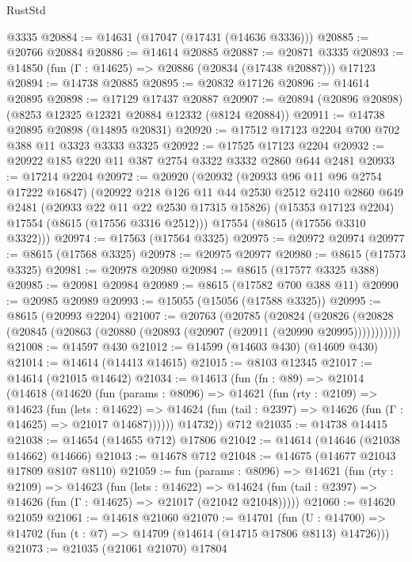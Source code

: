 \begin{lexlean}{RustStd}
\begin{coremodule}
    @3335
@20884 := @14631 (@17047 (@17431 (@14636 @3336)))
@20885 := @20766 @20884
@20886 := @14614 @20885
@20887 := @20871 @3335
@20893 := @14850 (fun (Γ : @14625) => @20886 (@20834 (@17438 @20887))) @17123
@20894 := @14738 @20885
@20895 := @20832 @17126
@20896 := @14614 @20895
@20898 := @17129 @17437 @20887
@20907 := @20894 (@20896 @20898) (@8253 @12325 @12321 @20884 @12332 (@8124 @20884))
@20911 := @14738 @20895 @20898 (@14895 @20831)
@20920 := @17512 @17123 @2204 @700 @702 @388 @11 @3323 @3333 @3325
@20922 := @17525 @17123 @2204
@20932 := @20922 @185 @220 @11 @387 @2754 @3322 @3332 @2860 @644 @2481
@20933 := @17214 @2204
@20972 := @20920
    (@20932
      (@20933 @96 @11 @96 @2754 @17222 @16847)
      (@20922
        @218
        @126
        @11
        @44
        @2530
        @2512
        @2410
        @2860
        @649
        @2481
        (@20933 @22 @11 @22 @2530 @17315 @15826)
        (@15353 @17123 @2204)
        @17554
        (@8615 (@17556 @3316 @2512)))
      @17554
      (@8615 (@17556 @3310 @3322)))
@20974 := @17563 (@17564 @3325)
@20975 := @20972 @20974
@20977 := @8615 (@17568 @3325)
@20978 := @20975 @20977
@20980 := @8615 (@17573 @3325)
@20981 := @20978 @20980
@20984 := @8615 (@17577 @3325 @388)
@20985 := @20981 @20984
@20989 := @8615 (@17582 @700 @388 @11)
@20990 := @20985 @20989
@20993 := @15055 (@15056 (@17588 @3325))
@20995 := @8615 (@20993 @2204)
@21007 := @20763
    (@20785
      (@20824
        (@20826 (@20828 (@20845 (@20863 (@20880 (@20893 (@20907 (@20911 (@20990 @20995)))))))))))
@21008 := @14597 @430
@21012 := @14599 (@14603 @430) (@14609 @430)
@21014 := @14614 (@14413 @14615)
@21015 := @8103 @12345
@21017 := @14614 (@21015 @14642)
@21034 := @14613
    (fun (fn : @89) =>
    @21014
      (@14618
        (@14620
          (fun (params : @8096) =>
          @14621
            (fun (rty : @2109) =>
            @14623
              (fun (lets : @14622) =>
              @14624 (fun (tail : @2397) => @14626 (fun (Γ : @14625) => @21017 @14687))))))
        @14732))
    @712
@21035 := @14738 @14415
@21038 := @14654 (@14655 @712) @17806
@21042 := @14614 (@14646 (@21038 @14662) @14666)
@21043 := @14678 @712
@21048 := @14675 (@14677 @21043 @17809 @8107 @8110)
@21059 := fun (params : @8096) =>
  @14621
    (fun (rty : @2109) =>
    @14623
      (fun (lets : @14622) =>
      @14624 (fun (tail : @2397) => @14626 (fun (Γ : @14625) => @21017 (@21042 @21048)))))
@21060 := @14620 @21059
@21061 := @14618 @21060
@21070 := @14701
    (fun (U : @14700) => @14702 (fun (t : @7) => @14709 (@14614 (@14715 @17806 @8113) @14726)))
@21073 := @21035 (@21061 @21070) @17804

\end{coremodule}
\end{lexlean}
